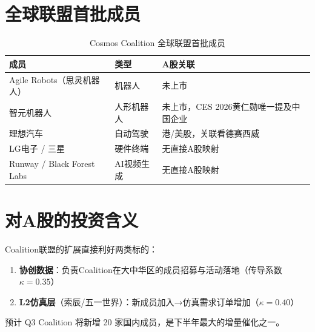 \section{全球联盟首批成员}

\begin{table}[H]
\centering
\small
\renewcommand{\arraystretch}{1.3}
\begin{tabularx}{\textwidth}{l l X}
\toprule
\textbf{成员} & \textbf{类型} & \textbf{A股关联} \\
\midrule
Agile Robots（思灵机器人） & 机器人 & 未上市 \\
智元机器人 & 人形机器人 & 未上市，CES 2026黄仁勋唯一提及中国企业 \\
理想汽车 & 自动驾驶 & 港/美股，关联看德赛西威 \\
LG电子 / 三星 & 硬件终端 & 无直接A股映射 \\
Runway / Black Forest Labs & AI视频生成 & 无直接A股映射 \\
\bottomrule
\end{tabularx}
\caption{Cosmos Coalition 全球联盟首批成员}
\end{table}

\section{对A股的投资含义}

Coalition联盟的扩展直接利好两类标的：
\begin{enumerate}[leftmargin=2em]
  \item \textbf{协创数据}：负责Coalition在大中华区的成员招募与活动落地（传导系数 $\kappa = 0.35$）
  \item \textbf{L2仿真层}（索辰/五一世界）：新成员加入→仿真需求订单增加（$\kappa = 0.40$）
\end{enumerate}

预计 Q3 Coalition 将新增 20 家国内成员，是下半年最大的增量催化之一。
